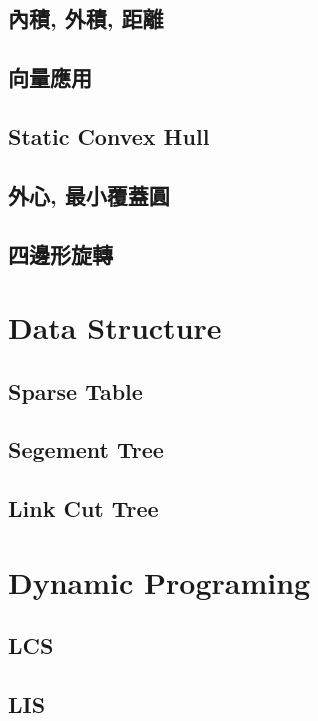\subsection{內積, 外積, 距離} 

\subsection{向量應用} 

\subsection{Static Convex Hull} 

\subsection{外心, 最小覆蓋圓} 

\subsection{四邊形旋轉} 


\section{Data Structure}
\subsection{Sparse Table}

\subsection{Segement Tree}

\subsection{Link Cut Tree}


\section{Dynamic Programing}
\subsection{LCS}

\subsection{LIS}

